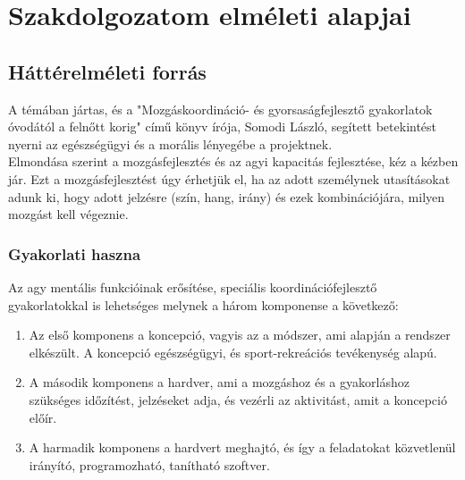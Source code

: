 \documentclass[tocnopagenum]{thesis-ekf}
\theoremstyle{definition}
\theoremstyle{remark}
\begin{document}
	

	\chapter{Szakdolgozatom elméleti alapjai}
	\section{Háttérelméleti forrás}
	\par
	A témában jártas, és a "Mozgáskoordináció- és gyorsaságfejlesztő gyakorlatok óvodától a felnőtt korig" \cite{SLaszlo} című könyv írója, Somodi László, segített betekintést nyerni az egészségügyi és a morális lényegébe a projektnek. \\ Elmondása szerint a mozgásfejlesztés és az agyi kapacitás fejlesztése, kéz a kézben jár. Ezt a mozgásfejlesztést úgy érhetjük el, ha az adott személynek utasításokat adunk ki, hogy adott jelzésre (szín, hang, irány) és ezek kombinációjára, milyen mozgást kell végeznie.
	\par 
	\subsection{Gyakorlati haszna}
	Az agy mentális funkcióinak erősítése, speciális koordinációfejlesztő gyakorlatokkal is lehetséges melynek a három komponense a következő: 
	\begin{enumerate}
	 
			\item	Az első komponens a koncepció, vagyis az a módszer, ami alapján a rendszer elkészült. A koncepció egészségügyi, és sport-rekreációs tevékenység alapú.
			\item	A második komponens a hardver, ami a mozgáshoz és a gyakorláshoz szükséges időzítést, jelzéseket adja, és vezérli az aktivitást, amit a koncepció előír.
			\item	A harmadik komponens a hardvert meghajtó, és így a feladatokat közvetlenül irányító, programozható, tanítható szoftver.
	\end{enumerate}
\end{document}
